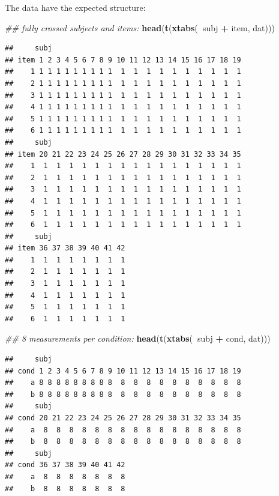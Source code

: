 \documentclass[12pt,]{krantz}
\newenvironment{Shaded}{\begin{snugshade}}{\end{snugshade}}
\newcommand{\CommentTok}[1]{\textcolor[rgb]{0.56,0.35,0.01}{\textit{#1}}}
\newcommand{\KeywordTok}[1]{\textcolor[rgb]{0.13,0.29,0.53}{\textbf{#1}}}
\newcommand{\NormalTok}[1]{#1}
\newcommand{\OperatorTok}[1]{\textcolor[rgb]{0.81,0.36,0.00}{\textbf{#1}}}
\newcommand{\StringTok}[1]{\textcolor[rgb]{0.31,0.60,0.02}{#1}}
\begin{document}
The data have the expected structure:

\begin{Shaded}
\begin{Highlighting}[]
\CommentTok{## fully crossed subjects and items:}
\KeywordTok{head}\NormalTok{(}\KeywordTok{t}\NormalTok{(}\KeywordTok{xtabs}\NormalTok{(}\OperatorTok{~}\NormalTok{subj }\OperatorTok{+}\StringTok{ }\NormalTok{item, dat)))}
\end{Highlighting}
\end{Shaded}

\begin{verbatim}
##     subj
## item 1 2 3 4 5 6 7 8 9 10 11 12 13 14 15 16 17 18 19
##    1 1 1 1 1 1 1 1 1 1  1  1  1  1  1  1  1  1  1  1
##    2 1 1 1 1 1 1 1 1 1  1  1  1  1  1  1  1  1  1  1
##    3 1 1 1 1 1 1 1 1 1  1  1  1  1  1  1  1  1  1  1
##    4 1 1 1 1 1 1 1 1 1  1  1  1  1  1  1  1  1  1  1
##    5 1 1 1 1 1 1 1 1 1  1  1  1  1  1  1  1  1  1  1
##    6 1 1 1 1 1 1 1 1 1  1  1  1  1  1  1  1  1  1  1
##     subj
## item 20 21 22 23 24 25 26 27 28 29 30 31 32 33 34 35
##    1  1  1  1  1  1  1  1  1  1  1  1  1  1  1  1  1
##    2  1  1  1  1  1  1  1  1  1  1  1  1  1  1  1  1
##    3  1  1  1  1  1  1  1  1  1  1  1  1  1  1  1  1
##    4  1  1  1  1  1  1  1  1  1  1  1  1  1  1  1  1
##    5  1  1  1  1  1  1  1  1  1  1  1  1  1  1  1  1
##    6  1  1  1  1  1  1  1  1  1  1  1  1  1  1  1  1
##     subj
## item 36 37 38 39 40 41 42
##    1  1  1  1  1  1  1  1
##    2  1  1  1  1  1  1  1
##    3  1  1  1  1  1  1  1
##    4  1  1  1  1  1  1  1
##    5  1  1  1  1  1  1  1
##    6  1  1  1  1  1  1  1
\end{verbatim}

\begin{Shaded}
\begin{Highlighting}[]
\CommentTok{## 8 measurements per condition:}
\KeywordTok{head}\NormalTok{(}\KeywordTok{t}\NormalTok{(}\KeywordTok{xtabs}\NormalTok{(}\OperatorTok{~}\NormalTok{subj }\OperatorTok{+}\StringTok{ }\NormalTok{cond, dat)))}
\end{Highlighting}
\end{Shaded}

\begin{verbatim}
##     subj
## cond 1 2 3 4 5 6 7 8 9 10 11 12 13 14 15 16 17 18 19
##    a 8 8 8 8 8 8 8 8 8  8  8  8  8  8  8  8  8  8  8
##    b 8 8 8 8 8 8 8 8 8  8  8  8  8  8  8  8  8  8  8
##     subj
## cond 20 21 22 23 24 25 26 27 28 29 30 31 32 33 34 35
##    a  8  8  8  8  8  8  8  8  8  8  8  8  8  8  8  8
##    b  8  8  8  8  8  8  8  8  8  8  8  8  8  8  8  8
##     subj
## cond 36 37 38 39 40 41 42
##    a  8  8  8  8  8  8  8
##    b  8  8  8  8  8  8  8
\end{verbatim}
\end{document}
